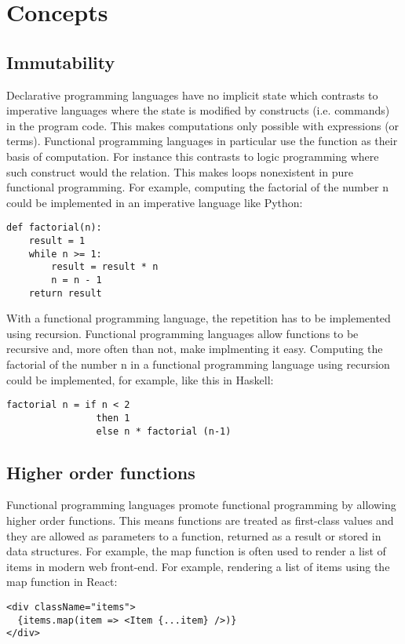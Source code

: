 \section{Concepts}

\subsection{Immutability}
Declarative programming languages have no implicit state which contrasts to imperative languages where the state is
modified by constructs (i.e. commands) in the program code. This makes computations only possible with expressions (or
terms). Functional programming languages in particular use the function as their basis of computation. For instance this
contrasts to logic programming where such construct would the relation. This makes loops nonexistent in pure functional
programming. For example, computing the factorial of the number n could be implemented in an imperative language like
Python:
\begin{verbatim}
def factorial(n):
    result = 1
    while n >= 1:
        result = result * n
        n = n - 1
    return result
\end{verbatim}
With a functional programming language, the repetition has to be implemented using recursion. Functional programming
languages allow functions to be recursive and, more often than not, make implmenting it easy. Computing the factorial
of the number n in a functional programming language using recursion could be implemented, for example, like this in
Haskell:
\begin{verbatim}
factorial n = if n < 2
                then 1
                else n * factorial (n-1)
\end{verbatim}
\cite{hudak}

\subsection{Higher order functions}
Functional programming languages promote functional programming by allowing higher order functions. This means functions
are treated as first-class values and they are allowed as parameters to a function, returned as a result or stored in
data structures.\cite{hudak} For example, the map function is often used to render a list of items in modern web
front-end.\cite{functionalreact} For example, rendering a list of items using the map function in React:
\begin{verbatim}
<div className="items">
  {items.map(item => <Item {...item} />)}
</div>
\end{verbatim}

